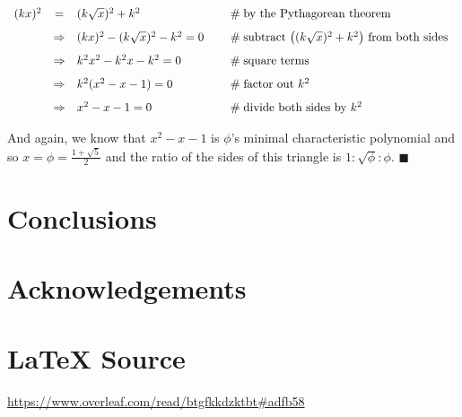 \documentclass{article}
\theoremstyle{definition}
\begin{document}
\vspace{1.50em}
\begin{math}
\begin{array}{rcll} 
(kx)^{2} 
&=& (k\sqrt{x})^{2} + k^{2}
		&\hspace{1.25em} \mathrel{\#} \text{by the Pythagorean theorem} \\
[8pt]
&\Rightarrow& (kx)^{2}- (k\sqrt{x})^{2} - k^{2} = 0 
		&\hspace{1.25em} \mathrel{\#} \text{subtract $\left ( (k\sqrt{x})^{2} + k^{2} \right )$ 
											from both sides } \\
[8pt]
&\Rightarrow& k^2x^2- k^2x - k^{2} = 0 
		&\hspace{1.25em} \mathrel{\#} \text{square terms} \\	
[8pt]
&\Rightarrow& k^{2}(x^{2} - x - 1) = 0 
		&\hspace{1.25em} \mathrel{\#} \text{factor out $k^2$} \\
[8pt]
&\Rightarrow& x^{2} - x - 1 = 0 
		&\hspace{1.25em} \mathrel{\#} \text{divide both sides by $k^2$}
\end{array}
\end{math} 

\bigskip
\noindent
And again, we know that $x^{2} - x - 1$ is $\phi$'s minimal
characteristic polynomial and so $x = \phi =
\frac{1+\sqrt{5}}{2}$ and the ratio of the sides of this triangle
is $1:\sqrt{\phi}:\phi$. $\blacksquare$
%
%
%
\section{Conclusions}
\label{section:conclusions}
%
%
%
\section*{Acknowledgements}
\label{section:acknowledgements}
%
%
\section*{\LaTeX \hspace{0.025 mm} Source}
\url{https://www.overleaf.com/read/btgfkkdzktbt#adfb58}
%
%
%


%
%
%
%
%
\end{document}
